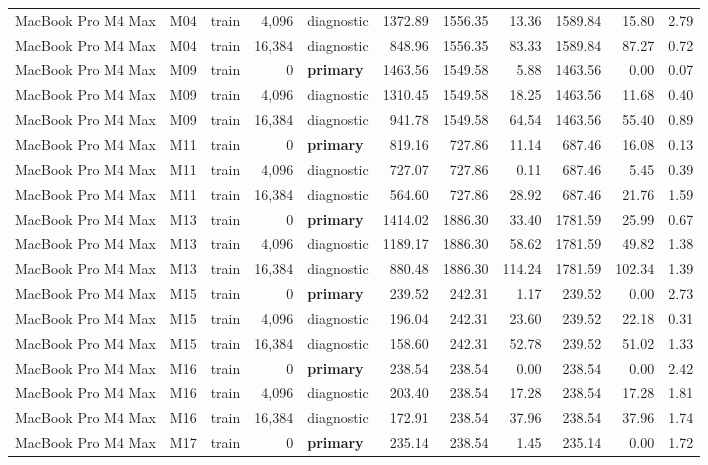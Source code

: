 \documentclass[10pt]{article}
\begin{document}
\begin{landscape}
\begin{longtable}{@{}l l l r l r r r r r r@{}}
MacBook Pro M4 Max & M04 & train & 4,096 & diagnostic & 1372.89 & 1556.35 & 13.36 & 1589.84 & 15.80 & 2.79 \\
MacBook Pro M4 Max & M04 & train & 16,384 & diagnostic & 848.96 & 1556.35 & 83.33 & 1589.84 & 87.27 & 0.72 \\
MacBook Pro M4 Max & M09 & train & 0 & \textbf{primary} & 1463.56 & 1549.58 & 5.88 & 1463.56 & 0.00 & 0.07 \\
MacBook Pro M4 Max & M09 & train & 4,096 & diagnostic & 1310.45 & 1549.58 & 18.25 & 1463.56 & 11.68 & 0.40 \\
MacBook Pro M4 Max & M09 & train & 16,384 & diagnostic & 941.78 & 1549.58 & 64.54 & 1463.56 & 55.40 & 0.89 \\
MacBook Pro M4 Max & M11 & train & 0 & \textbf{primary} & 819.16 & 727.86 & 11.14 & 687.46 & 16.08 & 0.13 \\
MacBook Pro M4 Max & M11 & train & 4,096 & diagnostic & 727.07 & 727.86 & 0.11 & 687.46 & 5.45 & 0.39 \\
MacBook Pro M4 Max & M11 & train & 16,384 & diagnostic & 564.60 & 727.86 & 28.92 & 687.46 & 21.76 & 1.59 \\
MacBook Pro M4 Max & M13 & train & 0 & \textbf{primary} & 1414.02 & 1886.30 & 33.40 & 1781.59 & 25.99 & 0.67 \\
MacBook Pro M4 Max & M13 & train & 4,096 & diagnostic & 1189.17 & 1886.30 & 58.62 & 1781.59 & 49.82 & 1.38 \\
MacBook Pro M4 Max & M13 & train & 16,384 & diagnostic & 880.48 & 1886.30 & 114.24 & 1781.59 & 102.34 & 1.39 \\
MacBook Pro M4 Max & M15 & train & 0 & \textbf{primary} & 239.52 & 242.31 & 1.17 & 239.52 & 0.00 & 2.73 \\
MacBook Pro M4 Max & M15 & train & 4,096 & diagnostic & 196.04 & 242.31 & 23.60 & 239.52 & 22.18 & 0.31 \\
MacBook Pro M4 Max & M15 & train & 16,384 & diagnostic & 158.60 & 242.31 & 52.78 & 239.52 & 51.02 & 1.33 \\
MacBook Pro M4 Max & M16 & train & 0 & \textbf{primary} & 238.54 & 238.54 & 0.00 & 238.54 & 0.00 & 2.42 \\
MacBook Pro M4 Max & M16 & train & 4,096 & diagnostic & 203.40 & 238.54 & 17.28 & 238.54 & 17.28 & 1.81 \\
MacBook Pro M4 Max & M16 & train & 16,384 & diagnostic & 172.91 & 238.54 & 37.96 & 238.54 & 37.96 & 1.74 \\
MacBook Pro M4 Max & M17 & train & 0 & \textbf{primary} & 235.14 & 238.54 & 1.45 & 235.14 & 0.00 & 1.72 \\

\end{longtable}
\end{landscape}
\end{document}
